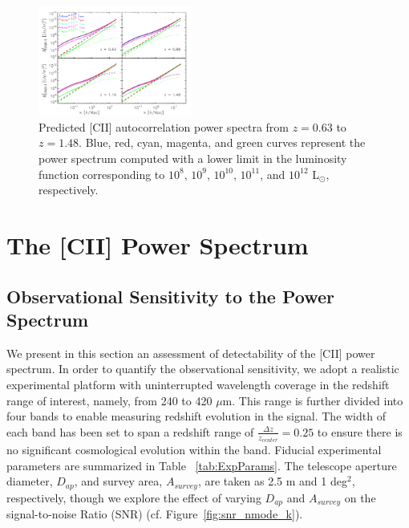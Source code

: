 \documentclass[iop,twocolappendix]{emulateapj}
\begin{document}
\begin{figure}
\centering
\includegraphics[width=0.45\textwidth]{pcii_STARFIRE_z63_z88_z116_z148_lirmin_halofit_bethermin_spinoglio_ap2p5m_1sqdeg_uhp_ktnonzero}
\caption{Predicted [CII] autocorrelation power spectra from $z = 0.63$ to $z = 1.48$. Blue, red, cyan, magenta, and green curves represent the power spectrum computed with a lower limit in the luminosity function corresponding to $10^8$, $10^9$, $10^{10}$, $10^{11}$, and $10^{12}$ L$_{\odot}$, respectively.}
\label{fig:pcii_lirmin}
\end{figure}

\section{The [CII] Power Spectrum}

\subsection{Observational Sensitivity to the Power Spectrum}

We present in this section an assessment of detectability of the [CII] power spectrum. In order to quantify the observational sensitivity, we adopt a realistic experimental platform with uninterrupted wavelength coverage in the redshift range of interest, namely, from 240 to 420 $\mu$m. This range is further divided into four bands to enable measuring redshift evolution in the signal. The width of each band has been set to span a redshift range of $\frac{\Delta{z}}{z_{center}} = 0.25$ to ensure there is no significant cosmological evolution within the band. Fiducial experimental parameters are summarized in Table ~\ref{tab:ExpParams}. The telescope aperture diameter, $D_{ap}$, and survey area, $A_{survey}$, are taken as 2.5 m and 1 deg$^2$, respectively, though we explore the effect of varying $D_{ap}$ and $A_{survey}$ on the signal-to-noise Ratio (SNR) (cf. Figure~\ref{fig:snr_nmode_k}).
\end{document}

